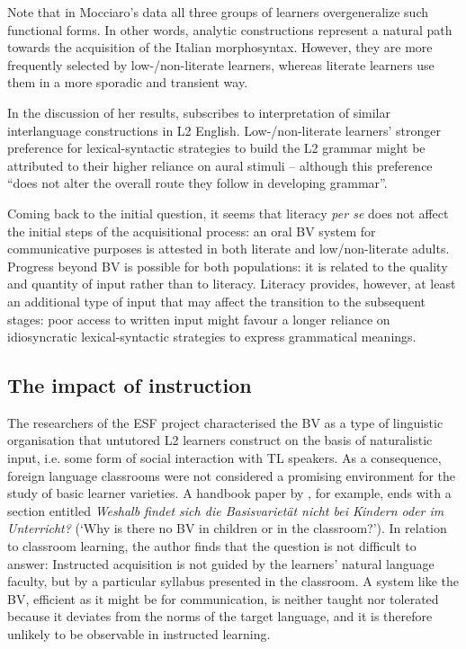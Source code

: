 \documentclass[output=paper]{langscibook}
\begin{document}
Note that in Mocciaro’s data all three groups of learners overgeneralize such functional forms. In other words, analytic constructions represent a natural path towards the acquisition of the Italian morphosyntax. However, they are more frequently selected by low-/non-literate learners, whereas literate learners use them in a more sporadic and transient way. 

In the discussion of her results, \citet[20]{Mocciaro2019} subscribes to  interpretation of similar interlanguage constructions in L2 English. Low-/non-literate learners’ stronger preference for lexical-syntactic strategies to build the L2 grammar might be attributed to their higher reliance on aural stimuli -- although this preference “does not alter the overall route they follow in developing grammar”. 

Coming back to the initial question, it seems that literacy \textit{per se} does not affect the initial steps of the acquisitional process: an oral BV system for communicative purposes is attested in both literate and low/non-literate adults. Progress beyond BV is possible for both populations: it is related to the quality and quantity of input rather than to literacy. Literacy provides, however, at least an additional type of input that may affect the transition to the subsequent stages: poor access to written input might favour a longer reliance on idiosyncratic lexical-syntactic strategies to express grammatical meanings. 

\subsection{The impact of instruction}\label{sec:benazzo:4.2}

The researchers of the ESF project characterised the BV as a type of linguistic organisation that untutored L2 learners construct on the basis of naturalistic input, i.e. some form of social interaction with TL speakers. As a consequence, foreign language classrooms were not considered a promising environment for the study of basic learner varieties. A handbook paper by \citet[567]{Klein2000}, for example, ends with a section entitled \textit{Weshalb findet sich die Basisvarietät nicht bei Kindern oder im Unterricht?} (‘Why is there no BV in children or in the classroom?’). In relation to classroom learning, the author finds that the question is not difficult to answer: Instructed acquisition is not guided by the learners’ natural language faculty, but by a particular syllabus presented in the classroom. A system like the BV, efficient as it might be for communication, is neither taught nor tolerated because it deviates from the norms of the target language, and it is therefore unlikely to be observable in instructed learning. 
\end{document}
